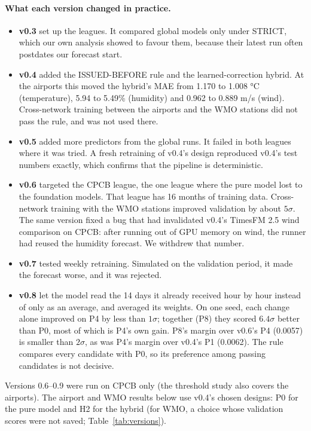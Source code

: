 \paragraph{What each version changed in practice.}
\begin{itemize}
\item \textbf{v0.3} set up the leagues. It compared global models only under STRICT, which our own analysis showed
to favour them, because their latest run often postdates our forecast start.
\item \textbf{v0.4} added the ISSUED-BEFORE rule and the learned-correction hybrid. At the airports this moved the
hybrid's MAE from 1.170 to 1.008 °C (temperature), 5.94 to 5.49\% (humidity) and 0.962 to 0.889 m/s (wind).
Cross-network training between the airports and the WMO stations did not pass the rule, and was not used there.
\item \textbf{v0.5} added more predictors from the global runs. It failed in both leagues where it was tried. A
fresh retraining of v0.4's design reproduced v0.4's test numbers exactly, which confirms that the pipeline is
deterministic.
\item \textbf{v0.6} targeted the CPCB league, the one league where the pure model lost to the foundation models.
That league has 16 months of training data. Cross-network training with the WMO stations improved validation by
about $5\sigma$. The same version fixed a bug that had invalidated v0.4's TimesFM 2.5 wind comparison on CPCB:
after running out of GPU memory on wind, the runner had reused the humidity forecast. We withdrew that number.
\item \textbf{v0.7} tested weekly retraining. Simulated on the validation period, it made the forecast worse, and it
was rejected.
\item \textbf{v0.8} let the model read the 14 days it already received hour by hour instead of only as an average,
and averaged its weights. On one seed, each change alone improved on P4 by less than $1\sigma$; together (P8)
they scored $6.4\sigma$ better than P0, most of which is P4's own gain. P8's
margin over v0.6's P4 (0.0057) is smaller than $2\sigma$, as was P4's margin over v0.4's P1 (0.0062). The rule
compares every candidate with P0, so its preference among passing candidates is not decisive.
\end{itemize}
Versions 0.6--0.9 were run on CPCB only (the threshold study also covers the airports). The airport and WMO results below use v0.4's chosen designs: P0 for the
pure model and H2 for the hybrid (for WMO, a choice whose validation scores were not saved; Table~\ref{tab:versions}).
